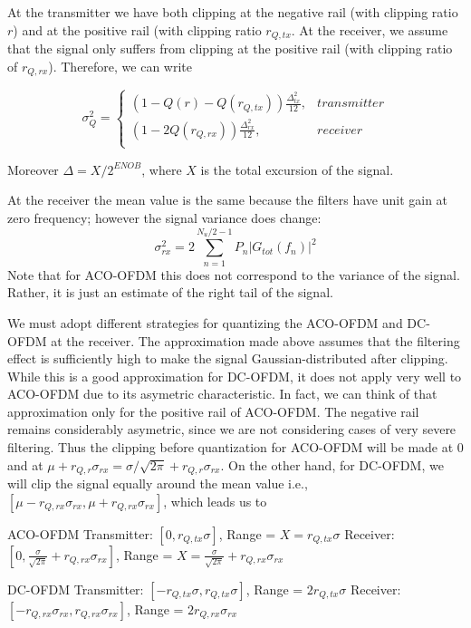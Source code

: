 \documentclass[a4paper]{article}
\begin{document}
At the transmitter we have both clipping at the negative rail (with clipping ratio $r$) and at the positive rail (with clipping ratio $r_{Q,tx}$. At the receiver, we assume that the signal only suffers from clipping at the positive rail (with clipping ratio of $r_{Q,rx}$). Therefore, we can write

\begin{equation}
\sigma^2_Q = \begin{cases}
(1-Q(r)-Q(r_{Q,tx}))\frac{\Delta_{tx}^2}{12}, & transmitter \\
(1-2Q(r_{Q,rx}))\frac{\Delta_{rx}^2}{12}, & receiver \\
\end{cases}
\end{equation}

Moreover $\Delta = X/2^{ENOB}$, where $X$ is the total excursion of the signal.  

At the receiver the mean value is the same because the filters have unit gain at zero frequency; however the signal variance does change:
\begin{equation}
\sigma_{rx}^2 = 2\sum_{n = 1}^{N_u/2-1}P_n|G_{tot}(f_n)|^2
\end{equation}
Note that for ACO-OFDM this does not correspond to the variance of the signal. Rather, it is just an estimate of the right tail of the signal.

We must adopt different strategies for quantizing the ACO-OFDM and DC-OFDM at the receiver. The approximation made above assumes that the filtering effect is sufficiently high to make the signal Gaussian-distributed after clipping. While this is a good approximation for DC-OFDM, it does not apply very well to ACO-OFDM due to its asymetric characteristic. In fact, we can think of that approximation only for the positive rail of ACO-OFDM. The negative rail remains considerably asymetric, since we are not considering cases of very severe filtering. Thus the clipping before quantization for ACO-OFDM will be made at 0 and at $\mu + r_{Q,r}\sigma_{rx} = \sigma/\sqrt{2\pi} + r_{Q,r}\sigma_{rx}$. On the other hand, for DC-OFDM, we will clip the signal equally around the mean value i.e., $[\mu - r_{Q,rx}\sigma_{rx}, \mu + r_{Q,rx}\sigma_{rx}]$, which leads us to

ACO-OFDM
Transmitter: $[0, r_{Q,tx}\sigma]$, Range = $X = r_{Q,tx}\sigma$
Receiver: $[0, \frac{\sigma}{\sqrt{2\pi}}+ r_{Q,rx}\sigma_{rx}]$, Range = $X =  \frac{\sigma}{\sqrt{2\pi}}+ r_{Q,rx}\sigma_{rx}$


DC-OFDM
Transmitter: $[-r_{Q,tx}\sigma, r_{Q,tx}\sigma]$, Range = $2r_{Q,tx}\sigma$
Receiver: $[-r_{Q,rx}\sigma_{rx}, r_{Q,rx}\sigma_{rx}]$, Range = $2r_{Q,rx}\sigma_{rx}$
\end{document}
